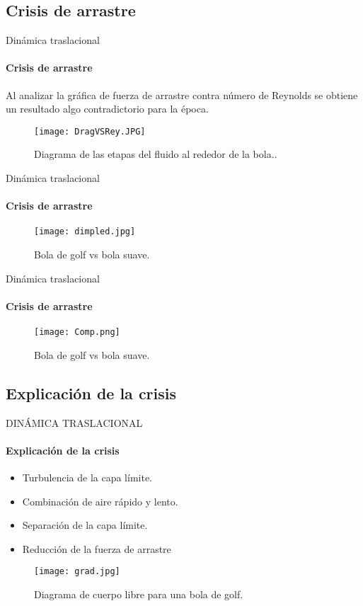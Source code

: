 \subsection{Crisis de arrastre}
\begin{frame}{Dinámica traslacional}
\framesubtitle{Crisis de arrastre}
	Al analizar la gráfica de fuerza de arrastre contra número de Reynolds se obtiene un resultado algo contradictorio para la época.
	\begin{figure}[H]
      \centering
      \texttt{[image: DragVSRey.JPG]}
      \caption{Diagrama de las etapas del fluido al rededor de la bola.\footnotemark{}.}
    \end{figure}
   \end{frame}
\begin{frame}{Dinámica traslacional}
\framesubtitle{Crisis de arrastre}
	\begin{figure}[H]
      \centering
      \texttt{[image: dimpled.jpg]}
      \caption{Bola de golf vs bola suave.}
    \end{figure}
\end{frame}

\begin{frame}{Dinámica traslacional}
\framesubtitle{Crisis de arrastre}
	\begin{figure}[H]
      \centering
      \texttt{[image: Comp.png]}
      \caption{Bola de golf vs bola suave.}
    \end{figure}
\end{frame}
 \subsection{Explicación de la crisis}
 \begin{frame}{DINÁMICA TRASLACIONAL}
 \framesubtitle{Explicación de la crisis}
 	\begin{itemize}
 	\item Turbulencia de la capa límite.
    \item Combinación de aire rápido y lento. 
    \item Separación de la capa límite.
    \item Reducción de la fuerza de arrastre
 	\end{itemize}
    \begin{figure}[H]
      \centering
      \texttt{[image: grad.jpg]}
      \caption{Diagrama de cuerpo libre para una bola de golf\footnotemark{}.}
    \end{figure}
 \end{frame}

